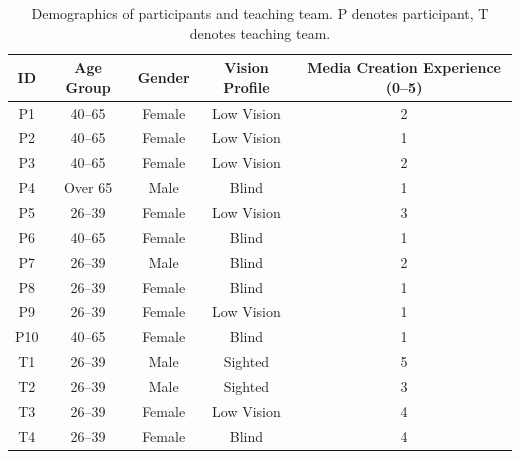 \begin{table}[]
\begin{tabular}{@{}ccccc@{}}
\toprule
\textbf{ID} & \textbf{Age Group} & \textbf{Gender} & \textbf{Vision Profile} & \textbf{Media Creation Experience (0--5)} \\ \midrule
P1          & 40--65              & Female          & Low Vision              & 2                                        \\
P2          & 40--65              & Female          & Low Vision              & 1                                        \\
P3          & 40--65              & Female          & Low Vision              & 2                                        \\
P4          & Over 65            & Male            & Blind                   & 1                                        \\
P5          & 26--39              & Female          & Low Vision              & 3                                        \\
P6          & 40--65              & Female          & Blind                   & 1                                        \\
P7          & 26--39              & Male            & Blind                   & 2                                        \\
P8          & 26--39              & Female          & Blind                   & 1                                        \\
P9          & 26--39              & Female          & Low Vision              & 1                                        \\
P10         & 40--65              & Female          & Blind                   & 1                                        \\
T1          & 26--39              & Male            & Sighted                 & 5                                        \\
T2          & 26--39              & Male            & Sighted                 & 3                                        \\
T3          & 26--39              & Female          & Low Vision              & 4                                        \\
T4          & 26--39              & Female          & Blind                   & 4                                        \\ \bottomrule
\end{tabular}
\caption{Demographics of participants and teaching team. P denotes participant, T denotes teaching team.}
\label{tab:demo}
\end{table}

